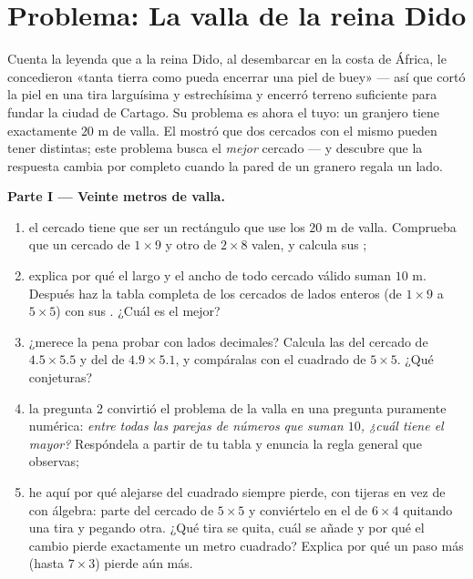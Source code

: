 \section{Problema: La valla de la reina Dido}

\begin{problem}
\label{pb:g6:measure:1}
Cuenta la leyenda que a la reina Dido, al desembarcar en la costa de África, le
concedieron «tanta tierra como pueda encerrar una piel de buey» --- así que cortó
la piel en una tira larguísima y estrechísima y encerró terreno
suficiente para fundar la ciudad de Cartago. Su problema es ahora el tuyo: un
granjero tiene exactamente $20$ m de valla. El 
mostró que dos cercados con el mismo  pueden tener 
distintas; este problema busca el \emph{mejor} cercado --- y descubre
que la respuesta cambia por completo cuando la pared de un granero regala
un lado.

\medskip
\noindent\textbf{Parte I --- Veinte metros de valla.}
\begin{enumerate}
  \item el cercado tiene que ser un rectángulo que use los $20$ m de valla.
        Comprueba que un cercado de $1 \times 9$ y otro de $2 \times 8$
        valen, y calcula sus ;
  \item explica por qué el largo y el ancho de todo cercado válido
        suman $10$ m. Después haz la tabla completa de los
        cercados de lados enteros (de $1 \times 9$ a $5 \times 5$) con
        sus . ¿Cuál es el mejor?
  \item ¿merece la pena probar con lados decimales? Calcula las  del
        cercado de $4.5 \times 5.5$ y del de $4.9 \times 5.1$, y
        compáralas con el cuadrado de $5 \times 5$. ¿Qué
        conjeturas?
  \item la pregunta 2 convirtió el problema de la valla en una pregunta
        puramente numérica: \emph{entre todas las parejas de números que suman
        $10$, ¿cuál tiene el  mayor?} Respóndela a partir de
        tu tabla y enuncia la regla general que observas;
  \item he aquí por qué alejarse del cuadrado siempre pierde,
        con tijeras en vez de con álgebra: parte del
        cercado de $5 \times 5$ y conviértelo en el de $6 \times 4$
        quitando una tira y pegando otra. ¿Qué
        tira se quita, cuál se añade y por qué el
        cambio pierde exactamente un metro cuadrado? Explica por qué un
        paso más (hasta $7 \times 3$) pierde aún más.
\end{enumerate}


\end{problem}
